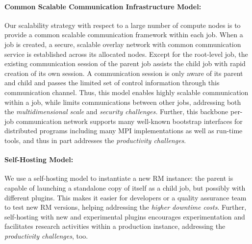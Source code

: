 \documentclass{article}
\begin{document}
\paragraph{Common Scalable Communication Infrastructure Model:}
Our scalability strategy with respect to a large number of compute nodes 
is to provide a common scalable communication framework within each
job. When a job is created, a secure, scalable overlay network with common
communication service is established across its allocated nodes.
Except for the root-level job, the existing communication session of the
parent job assists the child job with rapid creation of its own session.
A communication session is only aware of its parent and child and passes
the limited set of control information through this communication channel.
Thus, this model enables highly scalable communication within a job, 
while limits communications between other jobs, addressing both the 
{\sl multidimensional scale} and {\sl security challenges.} 
Further, this backbone per-job communication network supports 
many well-known bootstrap interfaces for distributed programs including
many MPI implementations as well as run-time tools, and thus in part
addresses the {\sl productivity challenges}. 


\paragraph{Self-Hosting Model:}
We use a self-hosting model to instantiate a new RM instance: the parent
is capable of launching a standalone copy of itself as a child job, but possibly
with different plugins. 
This makes it easier for developers or a quality assurance team to test new RM versions,
helping addressing the {\sl higher downtime costs}. 
Further, self-hosting with new and experimental plugins 
encourages experimentation and facilitates research activities 
within a production instance, addressing the {\sl productivity challenges}, too.
\end{document}
